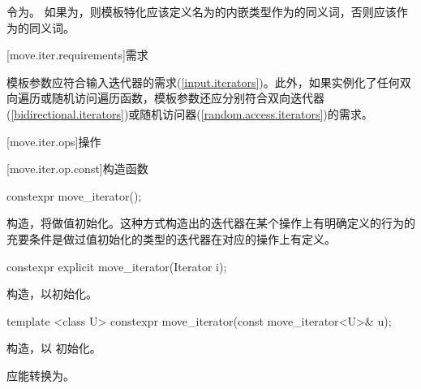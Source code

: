 \pnum
令为。
如果为，则模板特化应该定义名为的内嵌类型作为的同义词，否则应该作为的同义词。

[move.iter.requirements]{需求}

\pnum
模板参数应符合输入迭代器的需求(\ref{input.iterators})。此外，如果实例化了任何双向遍历或随机访问遍历函数，模板参数还应分别符合双向迭代器(\ref{bidirectional.iterators})或随机访问器(\ref{random.access.iterators})的需求。

[move.iter.ops]{操作}

[move.iter.op.const]{构造函数}

%
\begin{itemdecl}
constexpr move_iterator();
\end{itemdecl}

\begin{itemdescr}
\pnum
\effects 构造，将做值初始化。这种方式构造出的迭代器在某个操作上有明确定义的行为的充要条件是做过值初始化的类型的迭代器在对应的操作上有定义。
\end{itemdescr}


%
\begin{itemdecl}
constexpr explicit move_iterator(Iterator i);
\end{itemdecl}

\begin{itemdescr}
\pnum
\effects
构造，以初始化。
\end{itemdescr}


%
\begin{itemdecl}
template <class U> constexpr move_iterator(const move_iterator<U>& u);
\end{itemdecl}

\begin{itemdescr}
\pnum
\effects
构造，以 初始化。

\pnum
\requires {} 应能转换为。
\end{itemdescr}


